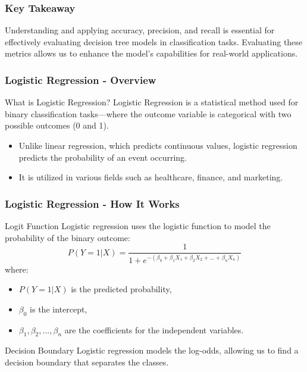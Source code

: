 \documentclass[aspectratio=169]{beamer}
\begin{document}
\begin{frame}[fragile]
    \frametitle{Key Takeaway}
    Understanding and applying accuracy, precision, and recall is essential for effectively evaluating decision tree models in classification tasks. Evaluating these metrics allows us to enhance the model's capabilities for real-world applications.
\end{frame}

\begin{frame}[fragile]
  \frametitle{Logistic Regression - Overview}
  \begin{block}{What is Logistic Regression?}
    Logistic Regression is a statistical method used for binary classification tasks—where the outcome variable is categorical with two possible outcomes (0 and 1).
  \end{block}
  \begin{itemize}
    \item Unlike linear regression, which predicts continuous values, logistic regression predicts the probability of an event occurring.
    \item It is utilized in various fields such as healthcare, finance, and marketing.
  \end{itemize}
\end{frame}

\begin{frame}[fragile]
  \frametitle{Logistic Regression - How It Works}
  \begin{block}{Logit Function}
    Logistic regression uses the logistic function to model the probability of the binary outcome:
    \begin{equation}
      P(Y=1|X) = \frac{1}{1 + e^{-(\beta_0 + \beta_1 X_1 + \beta_2 X_2 + ... + \beta_n X_n)}}
    \end{equation}
    where:
    \begin{itemize}
      \item \(P(Y=1|X)\) is the predicted probability,
      \item \(\beta_0\) is the intercept,
      \item \(\beta_1, \beta_2, ..., \beta_n\) are the coefficients for the independent variables.
    \end{itemize}
  \end{block}
  
  \begin{block}{Decision Boundary}
    Logistic regression models the log-odds, allowing us to find a decision boundary that separates the classes.
  \end{block}
\end{frame}
\end{document}
